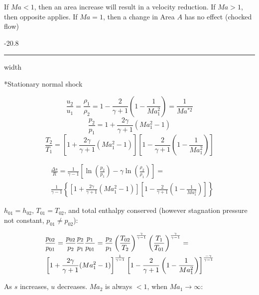 \documentclass[8pt, landscape, fleqn]{scrartcl}
\makeatletter
\renewcommand{\subsubsection}{\@startsection{subsubsection}{1}{0mm}%
{-2\baselineskip}{0.8\baselineskip}%
{\hrule depth 0.2pt width\columnwidth\vspace*{1.2em}\normalsize\bfseries\rmfamily}}
\makeatother
\begin{document}
\begin{multicols*}{3}
If $Ma < 1$, then an area increase will result in a velocity reduction. If $Ma > 1$, then opposite applies. If $Ma = 1$, then a change in Area $A$ has no effect (chocked flow)

\subsubsection*{Stationary normal shock}

\begin{equation}
    \frac{u_2}{u_1} = \frac{\rho_1}{\rho_2} = 1 - \frac{2}{\gamma+1} \left( 1- \frac{1}{Ma_1^2}\right) = \frac{1}{Ma^{*2}}
\end{equation}
\begin{equation}
    \frac{p_2}{p_1} = 1 + \frac{2 \gamma}{\gamma + 1} \left( Ma_1^2 - 1 \right)
\end{equation}
\begin{equation}
    \frac{T_2}{T_1} = \left[ 1 + \frac{2 \gamma}{\gamma + 1} \left( Ma_1^2 -1 \right) \right]\left[ 1-\frac{2}{\gamma+1} \left( 1-\frac{1}{Ma_1^2} \right) \right]
\end{equation}

\begin{align*}
    &\frac{\Delta s}{R} = \frac{1}{\gamma-1} \left[ \ln \left( \frac{p_2}{p_1} \right) - \gamma \ln \left( \frac{\rho_2}{\rho_1}\right)\right] = \\
    & \frac{1}{\gamma-1}\left\{\left[ 1 + \frac{2\gamma}{\gamma+1}\left( Ma_1^2 -1 \right)\right] \left[ 1-\frac{2}{\gamma+1}\left(1-\frac{1}{Ma_1^2}\right)\right]\right\}
\end{align*}

$h_{01} = h_{02}$, $T_{01} = T_{02}$, and total enthalpy conserved (however stagnation pressure not constant, $p_{01}\neq p_{02}$):

\begin{align*}
    &\frac{p_{02}}{p_{01}} = \frac{p_{02}}{p_{2}} \frac{p_2}{p_1} \frac{p_1}{p_{01}} = \frac{p_2}{p_1} \left( \frac{T_{02}}{T_2} \right)^{\frac{\gamma}{\gamma-1}}\left(\frac{T_1}{T_{01}}\right)^{\frac{\gamma}{\gamma-1}} = \\
    & \left[ 1 + \frac{2 \gamma}{\gamma + 1} (Ma_1^2 -1)\right]^{\frac{\-1}{\gamma-1}} \left[1- \frac{2}{\gamma+1} \left( 1-\frac{1}{Ma_1^2}\right)\right]^{\frac{-\gamma}{\gamma-1}} 
\end{align*}

As $s$ increases, $u$ decreases. $Ma_2$ is always $<1$, when $Ma_1 \rightarrow \infty$:


\end{multicols*}
\end{document}
